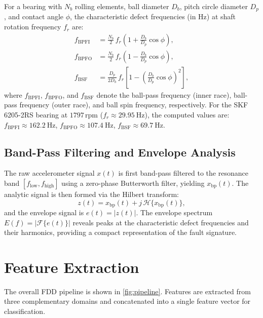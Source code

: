 \documentclass[conference,a4paper]{IEEEtran}[2015/08/26]
\begin{document}
For a bearing with $N_b$ rolling elements, ball diameter $D_b$,
pitch circle diameter $D_p$, and contact angle $\phi$, the
characteristic defect frequencies (in \si{\hertz}) at shaft
rotation frequency $f_r$ are:
\begin{align}
  f_{\text{BPFI}} &= \frac{N_b}{2}\,f_r
    \!\left(1 + \frac{D_b}{D_p}\cos\phi\right), \label{eq:bpfi}\\[4pt]
  f_{\text{BPFO}} &= \frac{N_b}{2}\,f_r
    \!\left(1 - \frac{D_b}{D_p}\cos\phi\right), \label{eq:bpfo}\\[4pt]
  f_{\text{BSF}} &= \frac{D_p}{2D_b}\,f_r
    \!\left[1 - \!\left(\frac{D_b}{D_p}\cos\phi\right)^{\!2}\right], \label{eq:bsf}
\end{align}
where $f_{\text{BPFI}}$, $f_{\text{BPFO}}$, and $f_{\text{BSF}}$
denote the ball-pass frequency (inner race), ball-pass frequency
(outer race), and ball spin frequency, respectively. For the SKF
6205-2RS bearing at $1797\,\text{rpm}$ ($f_r \approx \SI{29.95}{\hertz}$),
the computed values are:
$f_{\text{BPFI}} \approx \SI{162.2}{\hertz}$,
$f_{\text{BPFO}} \approx \SI{107.4}{\hertz}$,
$f_{\text{BSF}} \approx \SI{69.7}{\hertz}$.

\subsection{Band-Pass Filtering and Envelope Analysis}

The raw accelerometer signal $x(t)$ is first band-pass filtered to
the resonance band $[f_{\text{low}}, f_{\text{high}}]$ using a
zero-phase Butterworth filter, yielding $x_{\text{bp}}(t)$. The
analytic signal is then formed via the Hilbert transform:
\begin{equation}
  z(t) = x_{\text{bp}}(t) + j\,\mathcal{H}\{x_{\text{bp}}(t)\},
  \label{eq:hilbert}
\end{equation}
and the envelope signal is $e(t) = |z(t)|$. The envelope spectrum
$E(f) = |\mathcal{F}\{e(t)\}|$ reveals peaks at the characteristic
defect frequencies and their harmonics, providing a compact
representation of the fault signature.

\section{Feature Extraction}
\label{sec:features}

The overall FDD pipeline is shown in \cref{fig:pipeline}. Features are
extracted from three complementary domains and concatenated into a
single feature vector for classification.
\end{document}
